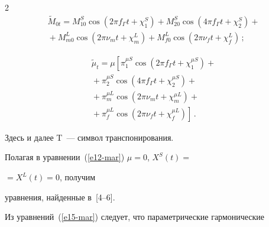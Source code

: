 \begin{multicols}{2}
\begin{multline*}
 \tilde M_{0t} = M_{10}^S \cos(2\pi f_\Gamma t +\chi_1^S)+M_{20}^S


    \cos(4\pi f_\Gamma t +\chi_2^S)+{}\\[2pt]


{}+M_{m0}^L \cos(2\pi \nu_m t +\chi_m^L)+ M_{f0}^L


    \cos(2\pi \nu_f t+\chi_f^L)\,;


    \end{multline*}


    


    \vspace*{-20pt}





\noindent


\begin{multline*}


\tilde\mu_t = \mu\left[ \pi_1^{\mu S} \cos(2\pi f_\Gamma t +\chi_1^{\mu S})+{}\right.\\


{}+


    \pi_2^{\mu S} \cos(4\pi f_\Gamma t +\chi_2^{\mu S})+{}\\


{}+\pi_m^{\mu L} \cos(2\pi \nu_m t +\chi_m^{\mu L})+{}\\


\left.{}+    \pi_f^{\mu L} \cos(2\pi \nu_f t +\chi_f^{\mu L})\right]\,.




    \end{multline*}


    


    \vspace*{-4pt}


    


    \noindent


Здесь и далее  T~--- символ транспонирования.





Полагая в уравнении~(\ref{e12-mar})  $\mu =0$, $X^S (t) =$\linebreak


$= X^L (t) = 0$, получим


уравнения, найденные в~[4--6].





Из уравнений~(\ref{e15-mar}) следует, что параметрические гармонические



\end{multicols}
